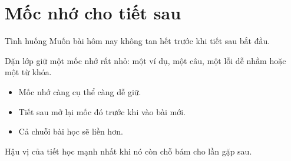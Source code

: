 \section{Mốc nhớ cho tiết sau}
\begin{tinhhuong}{Tình huống}
Muốn bài hôm nay không tan hết trước khi tiết sau bắt đầu.
\end{tinhhuong}
\begin{goiydungngay}
Dặn lớp giữ một mốc nhớ rất nhỏ: một ví dụ, một câu, một lỗi dễ nhầm hoặc một từ khóa.
\begin{itemize}
\item Mốc nhớ càng cụ thể càng dễ giữ.
\item Tiết sau mở lại mốc đó trước khi vào bài mới.
\item Cả chuỗi bài học sẽ liền hơn.
\end{itemize}
\end{goiydungngay}
\begin{cauchot}
Hậu vị của tiết học mạnh nhất khi nó còn chỗ bám cho lần gặp sau.
\end{cauchot}
